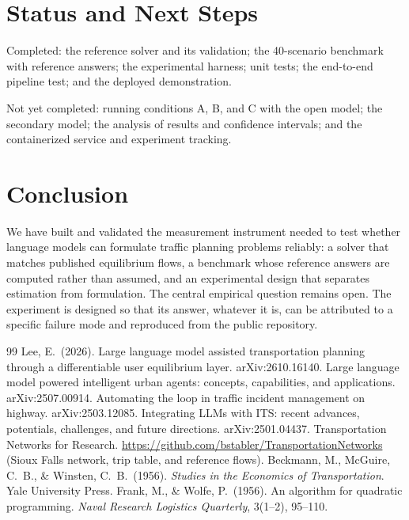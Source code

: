 \documentclass[11pt,a4paper]{article}
\begin{document}
\section{Status and Next Steps}
Completed: the reference solver and its validation; the 40-scenario benchmark with reference answers; the experimental harness; unit tests; the end-to-end pipeline test; and the deployed demonstration.

Not yet completed: running conditions A, B, and C with the open model; the secondary model; the analysis of results and confidence intervals; and the containerized service and experiment tracking.

\section{Conclusion}
We have built and validated the measurement instrument needed to test whether language models can formulate traffic planning problems reliably: a solver that matches published equilibrium flows, a benchmark whose reference answers are computed rather than assumed, and an experimental design that separates estimation from formulation. The central empirical question remains open. The experiment is designed so that its answer, whatever it is, can be attributed to a specific failure mode and reproduced from the public repository.

\begin{thebibliography}{99}
 Lee, E.\ (2026). Large language model assisted transportation planning through a differentiable user equilibrium layer. arXiv:2610.16140.
 Large language model powered intelligent urban agents: concepts, capabilities, and applications. arXiv:2507.00914.
 Automating the loop in traffic incident management on highway. arXiv:2503.12085.
 Integrating LLMs with ITS: recent advances, potentials, challenges, and future directions. arXiv:2501.04437.
 Transportation Networks for Research. \url{https://github.com/bstabler/TransportationNetworks} (Sioux Falls network, trip table, and reference flows).
 Beckmann, M., McGuire, C.\ B., \& Winsten, C.\ B.\ (1956). \emph{Studies in the Economics of Transportation}. Yale University Press.
 Frank, M., \& Wolfe, P.\ (1956). An algorithm for quadratic programming. \emph{Naval Research Logistics Quarterly}, 3(1--2), 95--110.
\end{thebibliography}
\end{document}
